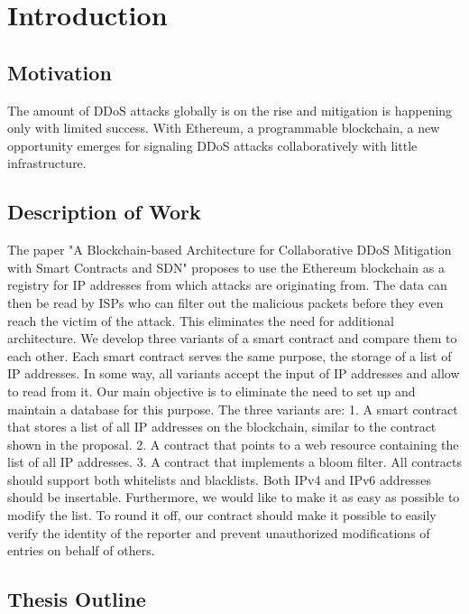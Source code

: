 \chapter{Introduction}

\section{Motivation}

The amount of DDoS attacks globally is on the rise and mitigation is happening only with limited success. With Ethereum, a programmable blockchain, a new opportunity emerges for signaling DDoS attacks collaboratively with little infrastructure. 

\section{Description of Work}

The paper {"}A Blockchain-based Architecture for Collaborative DDoS Mitigation with Smart Contracts and SDN{"} \cite{OriginalPaper} proposes to use the Ethereum blockchain as a registry for IP addresses from which attacks are originating from. The data can then be read by ISPs who can filter out the malicious packets before they even reach the victim of the attack. This eliminates the need for additional architecture.
We develop three variants of a smart contract and compare them to each other. Each smart contract serves the same purpose, the storage of a list of IP addresses. In some way, all variants accept the input of IP addresses and allow to read from it.
Our main objective is to eliminate the need to set up and maintain a database for this purpose.
The three variants are: 1. A smart contract that stores a list of all IP addresses on the blockchain, similar to the contract shown in the proposal. 2. A contract that points to a web resource containing the list of all IP addresses. 3. A contract that implements a bloom filter.
All contracts should support both whitelists and blacklists. Both IPv4 and IPv6 addresses should be insertable. Furthermore, we would like to make it as easy as possible to modify the list. To round it off, our contract should make it possible to easily verify the identity of the reporter and prevent unauthorized modifications of entries on behalf of others. 

\section{Thesis Outline}


